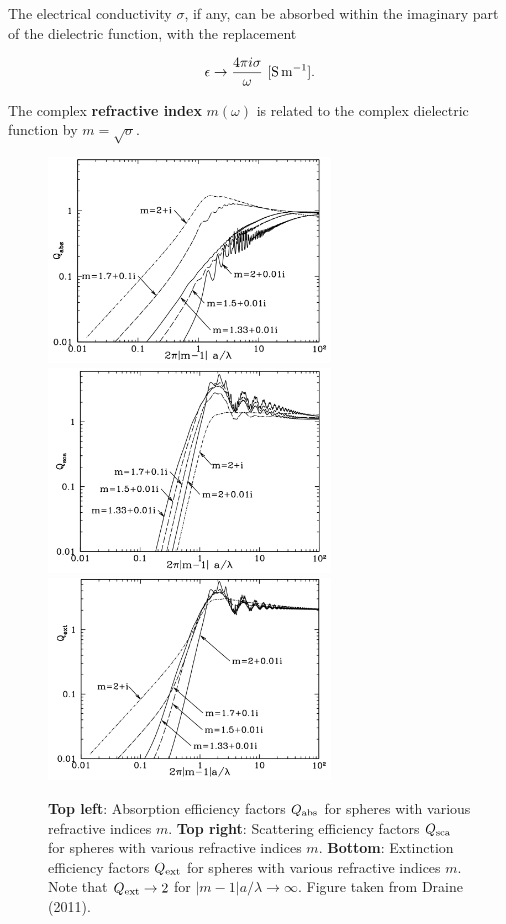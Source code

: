 \documentclass[a4paper,10pt]{article}
\begin{document}
{\noindent}The electrical conductivity $\sigma$, if any, can be absorbed within the imaginary part of the dielectric function, with the replacement

\begin{align*}
    \epsilon \rightarrow \frac{4\pi i\sigma}{\omega} ~ [{\rm S\,m^{-1}}].
\end{align*}

{\noindent}The complex \textbf{refractive index} $m(\omega)$ is related to the complex dielectric function by $m=\sqrt{\sigma}$.

\begin{figure}[t!]
    \centering
    \includegraphics[width=7.5cm]{figures/Qabs.png}
    \includegraphics[width=7.5cm]{figures/Qsca.png}
    \includegraphics[width=7.5cm]{figures/Qext.png}
    \caption{\footnotesize{\textbf{Top left}: Absorption efficiency factors $Q_{\rm abs}$ for spheres with various refractive indices $m$. \textbf{Top right}: Scattering efficiency factors $Q_{\rm sca}$ for spheres with various refractive indices $m$. \textbf{Bottom}: Extinction efficiency factors $Q_{\rm ext}$ for spheres with various refractive indices $m$. Note that $Q_{\rm ext}\rightarrow2$ for $|m-1|a/\lambda\rightarrow\infty$. Figure taken from Draine (2011).}}
    \label{fig:Q}
\end{figure}
\end{document}
